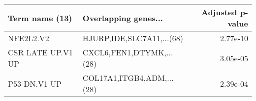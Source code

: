 \begin{tabular}{llr}
\toprule
   Term name (13) &      Overlapping genes... &  Adjusted p-value \\
\midrule
        NFE2L2.V2 & HJURP,IDE,SLC7A11,...(68) &          2.77e-10 \\
CSR LATE UP.V1 UP &  CXCL6,FEN1,DTYMK,...(28) &          3.05e-05 \\
     P53 DN.V1 UP & COL17A1,ITGB4,ADM,...(28) &          2.39e-04 \\
\bottomrule
\end{tabular}
